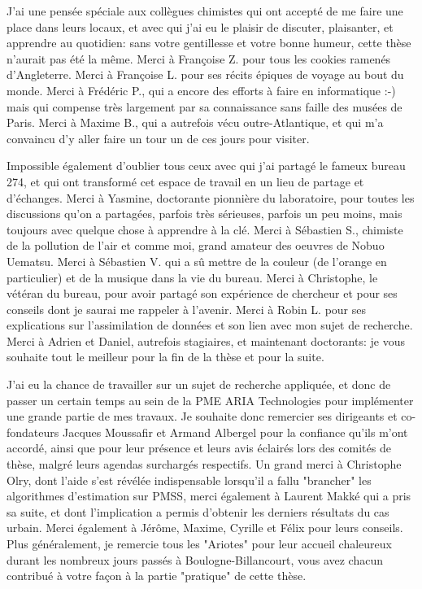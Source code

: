 { 
J'ai une pensée spéciale aux collègues chimistes qui ont accepté de me faire une place dans leurs locaux, et avec qui j'ai eu le plaisir de discuter, plaisanter, et apprendre au quotidien: sans votre gentillesse et votre bonne humeur, cette thèse n'aurait pas été la même. Merci à Françoise Z. pour tous les cookies ramenés d'Angleterre. Merci à Françoise L. pour ses récits épiques de voyage au bout du monde. Merci à Frédéric P., qui a encore des efforts à faire en informatique :-) mais qui compense très largement par sa connaissance sans faille des musées de Paris. Merci à Maxime B., qui a autrefois vécu outre-Atlantique, et qui m'a convaincu d'y aller faire un tour un de ces jours pour visiter. 

Impossible également d'oublier tous ceux avec qui j'ai partagé le fameux bureau 274, et qui ont transformé cet espace de travail en un lieu de partage et d'échanges. Merci à Yasmine,  doctorante pionnière du laboratoire, pour toutes les discussions qu'on a partagées, parfois très sérieuses, parfois un peu moins, mais toujours avec quelque chose à apprendre à la clé. Merci à Sébastien S., chimiste de la pollution de l'air et comme moi, grand amateur des oeuvres de Nobuo Uematsu. Merci à Sébastien V. qui a sû mettre de la couleur (de l'orange en particulier) et de la musique dans la vie du bureau. Merci à Christophe, le vétéran du bureau, pour avoir partagé son expérience de chercheur et pour ses conseils dont je saurai me rappeler à l'avenir. Merci à Robin L. pour ses explications sur l'assimilation de données et son lien avec mon sujet de recherche. Merci à Adrien et Daniel, autrefois stagiaires, et maintenant doctorants: je vous souhaite tout le meilleur pour la fin de la thèse et pour la suite. 

J'ai eu la chance de travailler sur un sujet de recherche appliquée, et donc de passer un certain temps au sein de la PME ARIA Technologies pour implémenter une grande partie de mes travaux. Je souhaite donc remercier ses dirigeants et co-fondateurs Jacques Moussafir et Armand Albergel pour la confiance qu'ils m'ont accordé,  ainsi que pour leur présence et leurs avis éclairés lors des comités de thèse, malgré leurs agendas surchargés respectifs. Un grand merci à Christophe Olry, dont l'aide s'est révélée indispensable lorsqu'il a fallu "brancher" les algorithmes d'estimation sur PMSS, merci également à Laurent Makké qui a pris sa suite, et dont l'implication a permis d'obtenir les derniers résultats du cas urbain. Merci également à Jérôme, Maxime, Cyrille et Félix pour leurs conseils. Plus généralement, je remercie tous les "Ariotes" pour leur accueil chaleureux durant les nombreux jours passés à Boulogne-Billancourt, vous avez chacun contribué à votre façon à la partie "pratique" de cette thèse. \\

}
